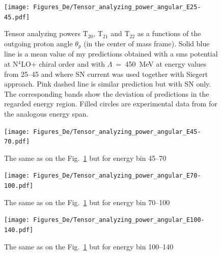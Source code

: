     \begin{figure}[h]
        \begin{center}
        \texttt{[image: Figures\_De/Tensor\_analyzing\_power\_angular\_E25-45.pdf]}
        \end{center}
        \caption{Tensor analyzing powers T$_{20}$, T$_{21}$ and T$_{22}$ as a functions of the
        outgoing proton angle $\theta_p$ (in the center of mass frame).
        Solid blue line is a mean value of my predictions obtained with a
        \gls*{sms} potential at N$^4$LO+ chiral order and with $\Lambda$~=~450~MeV
        at energy values from \SIrange[range-phrase=\text{ to }]{25}{45}{\mev} and
        where SN current was used together with Siegert approach. 
        Pink dashed line is similar prediction but with SN only. 
        The corresponding bands show the deviation of predictions in the regarded
        energy region.
        Filled circles are experimental data
        from \cite{rachek2007} for the analogous energy span.}
        \label{tensor_angular_25-45}
    \end{figure}

    \begin{figure}[h]
        \begin{center}
        \texttt{[image: Figures\_De/Tensor\_analyzing\_power\_angular\_E45-70.pdf]}
        \end{center}
        \caption{The same as on the Fig.~\ref*{tensor_angular_25-45} but for energy bin \SIrange{45}{70}{\mev}}
        \label{tensor_angular_45-70}
    \end{figure}

    \begin{figure}[h]
        \begin{center}
        \texttt{[image: Figures\_De/Tensor\_analyzing\_power\_angular\_E70-100.pdf]}
        \end{center}
        \caption{The same as on the Fig.~\ref*{tensor_angular_25-45} but for energy bin \SIrange{70}{100}{\mev}}
        \label{tensor_angular_70-100}
    \end{figure}        

    \begin{figure}[h]
        \begin{center}
        \texttt{[image: Figures\_De/Tensor\_analyzing\_power\_angular\_E100-140.pdf]}
        \end{center}
        \caption{The same as on the Fig.~\ref*{tensor_angular_25-45} but for energy bin \SIrange{100}{140}{\mev}}
        \label{tensor_angular_100-140}
    \end{figure}
        
